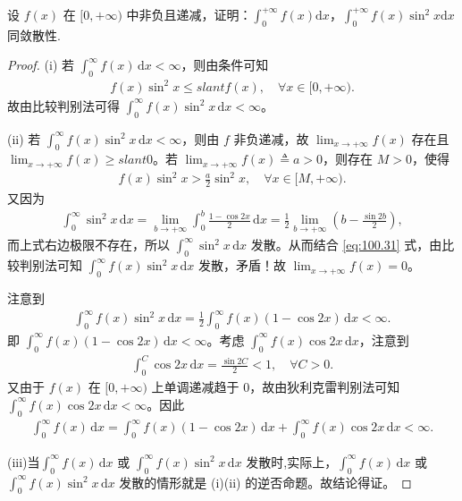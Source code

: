 \documentclass[../../main.tex]{subfiles}
\begin{document}
\begin{example}
设 \(f(x)\) 在 \([0,+\infty)\) 中非负且递减，证明：\(\int_{0}^{+\infty} f(x) \mathrm{d}x\)，\(\int_{0}^{+\infty} f(x)\sin^{2}x \mathrm{d}x\) 同敛散性. 
\end{example}
\begin{proof}
(i) 若 \(\int_0^\infty f(x) \, \mathrm{d}x < \infty\)，则由条件可知
\begin{align*}
f(x) \sin^2 x \leqslant slant f(x), \quad \forall x \in [0, +\infty).
\end{align*}
故由比较判别法可得 \(\int_0^\infty f(x) \sin^2 x \, \mathrm{d}x < \infty\)。

(ii) 若 \(\int_0^\infty f(x) \sin^2 x \, \mathrm{d}x < \infty\)，则由 \(f\) 非负递减，故 \(\lim_{x \to +\infty} f(x)\) 存在且 \(\lim_{x \to +\infty} f(x) \geqslant slant 0\)。若 \(\lim_{x \to +\infty} f(x) \triangleq a > 0\)，则存在 \(M > 0\)，使得
\begin{align}
f(x) \sin^2 x > \frac{a}{2} \sin^2 x, \quad \forall x \in [M, +\infty). \label{eq:100.31}
\end{align}
又因为
\begin{align*}
\int_0^\infty \sin^2 x \, \mathrm{d}x = \lim_{b \to +\infty} \int_0^b \frac{1 - \cos 2x}{2} \, \mathrm{d}x = \frac{1}{2} \lim_{b \to +\infty} \left( b - \frac{\sin 2b}{2} \right),
\end{align*}
而上式右边极限不存在，所以 \(\int_0^\infty \sin^2 x \, \mathrm{d}x\) 发散。从而结合 \eqref{eq:100.31} 式，由比较判别法可知 \(\int_0^\infty f(x) \sin^2 x \, \mathrm{d}x\) 发散，矛盾！故 \(\lim_{x \to +\infty} f(x) = 0\)。

注意到
\begin{align*}
\int_0^\infty f(x) \sin^2 x \, \mathrm{d}x = \frac{1}{2} \int_0^\infty f(x) (1 - \cos 2x) \, \mathrm{d}x < \infty.
\end{align*}
即 \(\int_0^\infty f(x) (1 - \cos 2x) \, \mathrm{d}x < \infty\)。考虑 \(\int_0^\infty f(x) \cos 2x \, \mathrm{d}x\)，注意到
\begin{align*}
\int_0^C \cos 2x \, \mathrm{d}x = \frac{\sin 2C}{2} < 1, \quad \forall C > 0.
\end{align*}
又由于 \(f(x)\) 在 \([0, +\infty)\) 上单调递减趋于 0，故由狄利克雷判别法可知 \(\int_0^\infty f(x) \cos 2x \, \mathrm{d}x < \infty\)。因此
\begin{align*}
\int_0^\infty f(x) \, \mathrm{d}x = \int_0^\infty f(x) (1 - \cos 2x) \, \mathrm{d}x + \int_0^\infty f(x) \cos 2x \, \mathrm{d}x < \infty.
\end{align*}

(iii)当\(\int_0^\infty f(x) \, \mathrm{d}x\) 或 \(\int_0^\infty f(x) \sin^2 x \, \mathrm{d}x\) 发散时,实际上，\(\int_0^\infty f(x) \, \mathrm{d}x\) 或 \(\int_0^\infty f(x) \sin^2 x \, \mathrm{d}x\) 发散的情形就是 (i)(ii) 的逆否命题。故结论得证。
\end{proof}
\end{document}
